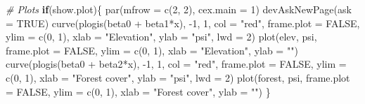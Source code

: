 \documentclass[
]{book}
\newenvironment{Shaded}{\begin{snugshade}}{\end{snugshade}}
\newcommand{\AttributeTok}[1]{\textcolor[rgb]{0.77,0.63,0.00}{#1}}
\newcommand{\CommentTok}[1]{\textcolor[rgb]{0.56,0.35,0.01}{\textit{#1}}}
\newcommand{\ConstantTok}[1]{\textcolor[rgb]{0.00,0.00,0.00}{#1}}
\newcommand{\ControlFlowTok}[1]{\textcolor[rgb]{0.13,0.29,0.53}{\textbf{#1}}}
\newcommand{\DecValTok}[1]{\textcolor[rgb]{0.00,0.00,0.81}{#1}}
\newcommand{\FunctionTok}[1]{\textcolor[rgb]{0.00,0.00,0.00}{#1}}
\newcommand{\NormalTok}[1]{#1}
\newcommand{\SpecialCharTok}[1]{\textcolor[rgb]{0.00,0.00,0.00}{#1}}
\newcommand{\StringTok}[1]{\textcolor[rgb]{0.31,0.60,0.02}{#1}}
\begin{document}
\begin{Shaded}
\begin{Highlighting}[]
\CommentTok{\# Plots}
\ControlFlowTok{if}\NormalTok{(show.plot)\{}
  \FunctionTok{par}\NormalTok{(}\AttributeTok{mfrow =} \FunctionTok{c}\NormalTok{(}\DecValTok{2}\NormalTok{, }\DecValTok{2}\NormalTok{), }\AttributeTok{cex.main =} \DecValTok{1}\NormalTok{)}
  \FunctionTok{devAskNewPage}\NormalTok{(}\AttributeTok{ask =} \ConstantTok{TRUE}\NormalTok{)}
  \FunctionTok{curve}\NormalTok{(}\FunctionTok{plogis}\NormalTok{(beta0 }\SpecialCharTok{+}\NormalTok{ beta1}\SpecialCharTok{*}\NormalTok{x), }\SpecialCharTok{{-}}\DecValTok{1}\NormalTok{, }\DecValTok{1}\NormalTok{, }\AttributeTok{col =} \StringTok{"red"}\NormalTok{, }\AttributeTok{frame.plot =} \ConstantTok{FALSE}\NormalTok{, }
      \AttributeTok{ylim =} \FunctionTok{c}\NormalTok{(}\DecValTok{0}\NormalTok{, }\DecValTok{1}\NormalTok{), }\AttributeTok{xlab =} \StringTok{"Elevation"}\NormalTok{, }\AttributeTok{ylab =} \StringTok{"psi"}\NormalTok{, }\AttributeTok{lwd =} \DecValTok{2}\NormalTok{)}
  \FunctionTok{plot}\NormalTok{(elev, psi, }\AttributeTok{frame.plot =} \ConstantTok{FALSE}\NormalTok{, }\AttributeTok{ylim =} \FunctionTok{c}\NormalTok{(}\DecValTok{0}\NormalTok{, }\DecValTok{1}\NormalTok{), }\AttributeTok{xlab =} \StringTok{"Elevation"}\NormalTok{, }
     \AttributeTok{ylab =} \StringTok{""}\NormalTok{)}
  \FunctionTok{curve}\NormalTok{(}\FunctionTok{plogis}\NormalTok{(beta0 }\SpecialCharTok{+}\NormalTok{ beta2}\SpecialCharTok{*}\NormalTok{x), }\SpecialCharTok{{-}}\DecValTok{1}\NormalTok{, }\DecValTok{1}\NormalTok{, }\AttributeTok{col =} \StringTok{"red"}\NormalTok{, }\AttributeTok{frame.plot =} \ConstantTok{FALSE}\NormalTok{, }
      \AttributeTok{ylim =} \FunctionTok{c}\NormalTok{(}\DecValTok{0}\NormalTok{, }\DecValTok{1}\NormalTok{), }\AttributeTok{xlab =} \StringTok{"Forest cover"}\NormalTok{, }\AttributeTok{ylab =} \StringTok{"psi"}\NormalTok{, }\AttributeTok{lwd =} \DecValTok{2}\NormalTok{)}
  \FunctionTok{plot}\NormalTok{(forest, psi, }\AttributeTok{frame.plot =} \ConstantTok{FALSE}\NormalTok{, }\AttributeTok{ylim =} \FunctionTok{c}\NormalTok{(}\DecValTok{0}\NormalTok{, }\DecValTok{1}\NormalTok{), }\AttributeTok{xlab =} \StringTok{"Forest cover"}\NormalTok{, }
     \AttributeTok{ylab =} \StringTok{""}\NormalTok{)}
\NormalTok{\}}


\end{Highlighting}
\end{Shaded}
\end{document}
